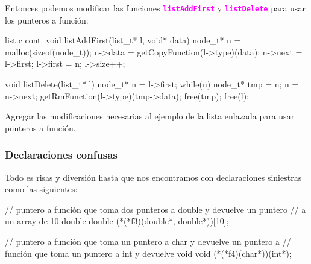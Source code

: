 \documentclass[]{scrartcl}
\newcommand{\hl}[1]{\textcolor{magenta}{\textbf{\texttt{#1}}}}
\begin{document}
Entonces podemos modificar las funciones \hl{listAddFirst} y \hl{listDelete} para usar los punteros a función:

\begin{cbox}[]{list.c cont.}
  void listAddFirst(list_t* l, void* data) {
    node_t* n = malloc(sizeof(node_t));
    n->data = getCopyFunction(l->type)(data);
    n->next = l->first;
    l->first = n;
    l->size++;
  }

  void listDelete(list_t* l){
    node_t* n = l->first;
    while(n){
      node_t* tmp = n;
      n = n->next;
      getRmFunction(l->type)(tmp->data);
      free(tmp);
    }
    free(l);
  }
\end{cbox}

\begin{exbox}
  Agregar las modificaciones necesarias al ejemplo de la lista enlazada para usar punteros a función.
\end{exbox}

\subsubsection*{Declaraciones confusas}

Todo es risas y diversión hasta que nos encontramos con declaraciones siniestras como las siguientes:

\begin{cbox}[]{}
  // puntero a función que toma dos punteros a double y devuelve un puntero 
  // a un array de 10 double
  double (*(*f3)(double*, double*))[10];

  // puntero a función que toma un puntero a char y devuelve un puntero a 
  // función que toma un puntero a int y devuelve void
  void (*(*f4)(char*))(int*);
\end{cbox}
\end{document}
